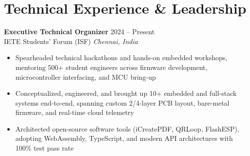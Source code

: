 \documentclass[a4paper,10pt]{article}
\newcommand{\resumeItem}[1]{\item #1}
\newenvironment{resumeItemize}{\begin{itemize}[leftmargin=*, itemsep=0.5pt, topsep=0.8pt]}{\end{itemize}}
\begin{document}
\section*{Technical Experience \& Leadership}
\textbf{Executive Technical Organizer} \hfill 2024 -- Present \\
IETE Students' Forum (ISF) \hfill \textit{Chennai, India}
\begin{resumeItemize}
    \resumeItem{Spearheaded technical hackathons and hands-on embedded workshops, mentoring 500+ student engineers across firmware development, microcontroller interfacing, and MCU bring-up}
    \resumeItem{Conceptualized, engineered, and brought up 10+ embedded and full-stack systems end-to-end, spanning custom 2/4-layer PCB layout, bare-metal firmware, and real-time cloud telemetry}
    \resumeItem{Architected open-source software tools (iCreatePDF, QRLoop, FlashESP), adopting WebAssembly, TypeScript, and modern API architectures with 100\% test pass rate}
\end{resumeItemize}
\end{document}
